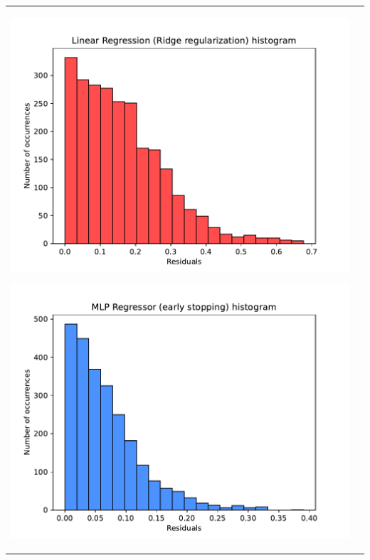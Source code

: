 \documentclass[11pt,a4paper]{article}
\begin{document}
\begin{flushleft}
\begin{tabularx}{1.09\textwidth} {X X}
    \hspace{-4.75mm}\includegraphics[scale=0.6]{hw03_plot_linreg_hist} \par
    \vspace{-2mm}\hspace{-4.75mm}\includegraphics[scale=0.6]{hw03_plot_mlp1_hist} \par
  \end{tabularx}
\end{flushleft}
\end{document}
